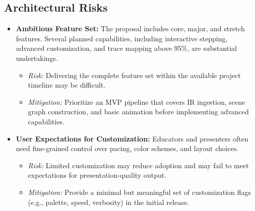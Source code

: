 \subsection{Architectural Risks}
\begin{itemize}
  \item \textbf{Ambitious Feature Set:} The proposal includes core, major, and stretch features. Several planned capabilities, including interactive stepping, advanced customization, and trace mapping above 95\%, are substantial undertakings.
  \begin{itemize}
    \item \textit{Risk:} Delivering the complete feature set within the available project timeline may be difficult.
    \item \textit{Mitigation:} Prioritize an MVP pipeline that covers IR ingestion, scene graph construction, and basic animation before implementing advanced capabilities.
  \end{itemize}

  \item \textbf{User Expectations for Customization:} Educators and presenters often need fine-grained control over pacing, color schemes, and layout choices.
  \begin{itemize}
    \item \textit{Risk:} Limited customization may reduce adoption and may fail to meet expectations for presentation-quality output.
    \item \textit{Mitigation:} Provide a minimal but meaningful set of customization flags (e.g., palette, speed, verbosity) in the initial release.
  \end{itemize}
\end{itemize}
